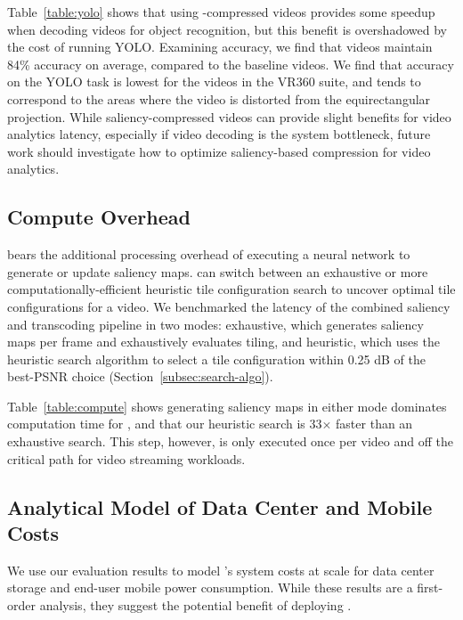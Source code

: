 Table~\ref{table:yolo} shows that using \name-compressed videos provides some speedup when decoding videos for object recognition, but this benefit is overshadowed by the cost of running YOLO.
Examining accuracy, we find that \name videos maintain 84\% accuracy on average, compared to the baseline \hevc videos.
We find that accuracy on the YOLO task is lowest for the videos in the VR360 suite, and tends to correspond to the areas where the video is distorted from the equirectangular projection.
While saliency-compressed videos can provide slight benefits for video analytics latency, especially if video decoding is the system bottleneck, future work should investigate how to optimize saliency-based compression for video analytics.


\subsection{Compute Overhead}
\nameCompress bears the additional processing overhead of executing a neural network to generate or update saliency maps.
\nameStore can switch between an exhaustive or more computationally-efficient heuristic tile configuration search to uncover optimal tile configurations for a video.
We benchmarked the latency of the combined saliency and transcoding pipeline in two modes: exhaustive, which generates saliency maps per frame and exhaustively evaluates tiling, and heuristic, which uses the heuristic search algorithm to select a tile configuration within 0.25 dB of the best-PSNR choice (Section~\ref{subsec:search-algo}).

\computeTable

Table~\ref{table:compute} shows generating saliency maps in either mode dominates computation time for \name, and that our heuristic search is 33$\times$ faster than an exhaustive search.
This step, however, is only executed once per video and off the critical path for video streaming workloads.


\subsection{Analytical Model of \name Data Center and Mobile Costs}
\label{subsec:datacentermobile}
We use our evaluation results to model \name's system costs at scale for data center storage and end-user mobile power consumption. While these results are a first-order analysis, they suggest the potential benefit of deploying \name.


